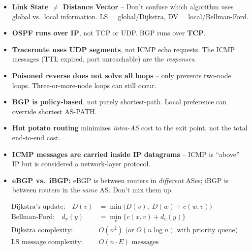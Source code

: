 \begin{warnbox}
\begin{itemize}[noitemsep]
    \item \textbf{Link State $\neq$ Distance Vector} -- Don't confuse which algorithm uses global vs.\ local information. LS = global/Dijkstra, DV = local/Bellman-Ford.
    \item \textbf{OSPF runs over IP}, not TCP or UDP. BGP runs over \textbf{TCP}.
    \item \textbf{Traceroute uses UDP segments}, not ICMP echo requests. The ICMP messages (TTL expired, port unreachable) are the \emph{responses}.
    \item \textbf{Poisoned reverse does not solve all loops} -- only prevents two-node loops. Three-or-more-node loops can still occur.
    \item \textbf{BGP is policy-based}, not purely shortest-path. Local preference can override shortest AS-PATH.
    \item \textbf{Hot potato routing} minimizes \emph{intra-AS} cost to the exit point, not the total end-to-end cost.
    \item \textbf{ICMP messages are carried inside IP datagrams} -- ICMP is ``above'' IP but is considered a network-layer protocol.
    \item \textbf{eBGP vs.\ iBGP:} eBGP is between routers in \emph{different} ASes; iBGP is between routers in the \emph{same} AS. Don't mix them up.
\end{itemize}
\end{warnbox}

\begin{formulabox}
\begin{align}
\text{Dijkstra's update:} \quad D(v) &= \min\big(D(v),\; D(w) + c(w,v)\big) \\
\text{Bellman-Ford:} \quad d_x(y) &= \min_v \big\{ c(x,v) + d_v(y) \big\} \\
\text{Dijkstra complexity:} \quad &O(n^2) \text{ (or } O(n \log n) \text{ with priority queue)} \\
\text{LS message complexity:} \quad &O(n \cdot E) \text{ messages}
\end{align}
\end{formulabox}
